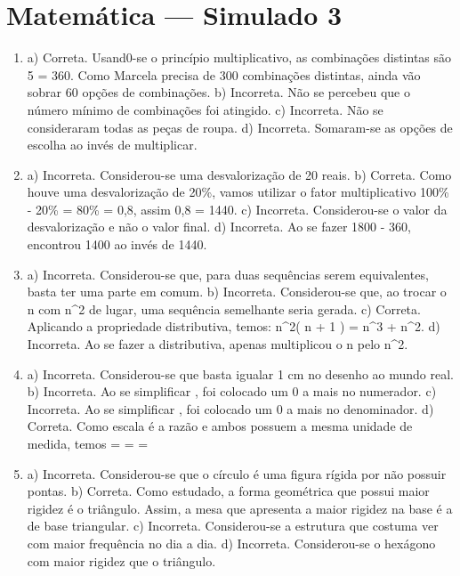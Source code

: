 \section*{Matemática — Simulado 3}

\begin{enumerate}
\item a) Correta. Usand0-se o princípio multiplicativo, as combinações
distintas são 5     = 360. Como Marcela precisa de 300 combinações distintas, ainda vão sobrar 60 opções de combinações.
b) Incorreta. Não se percebeu que o número mínimo de combinações foi atingido.
c) Incorreta. Não se consideraram todas as peças de roupa.
d) Incorreta. Somaram-se as opções de escolha ao invés de multiplicar.


\item a) Incorreta. Considerou-se uma desvalorização de 20 reais.
b) Correta. Como houve uma desvalorização de 20\%, vamos utilizar
o fator multiplicativo 100\% - 20\% = 80\% = 0,8, assim 0,8  = 1440.
c) Incorreta. Considerou-se o valor da desvalorização e não o valor final.
d) Incorreta. Ao se fazer 1800 - 360, encontrou 1400 ao invés de 1440.


\item a) Incorreta. Considerou-se que, para duas sequências serem equivalentes, basta ter uma parte em comum.
b) Incorreta. Considerou-se que, ao trocar o n com n^2 de lugar, uma sequência semelhante seria gerada.
c) Correta. Aplicando a propriedade distributiva, temos:
n^{2}\left( n + 1 \right) = n^{3} + n^{2}.
d) Incorreta. Ao se fazer a distributiva, apenas multiplicou o n pelo n^2.

\item a) Incorreta. Considerou-se que basta igualar 1 cm no desenho ao mundo real.
b) Incorreta. Ao se simplificar , foi colocado um 0 a mais no numerador.
c) Incorreta. Ao se simplificar , foi colocado um 0 a mais no denominador.
d) Correta. Como escala é a razão
 e ambos possuem a mesma unidade
de medida, temos  =  =  = 


\item a) Incorreta. Considerou-se que o círculo é uma figura rígida por não possuir pontas.
b) Correta. Como estudado, a forma geométrica que possui maior rigidez é o triângulo. Assim, a mesa que apresenta a maior rigidez na base é a de base triangular.
c) Incorreta. Considerou-se a estrutura que costuma ver com maior frequência no dia a dia.
d) Incorreta. Considerou-se o hexágono com maior rigidez que o triângulo.


\end{enumerate}
